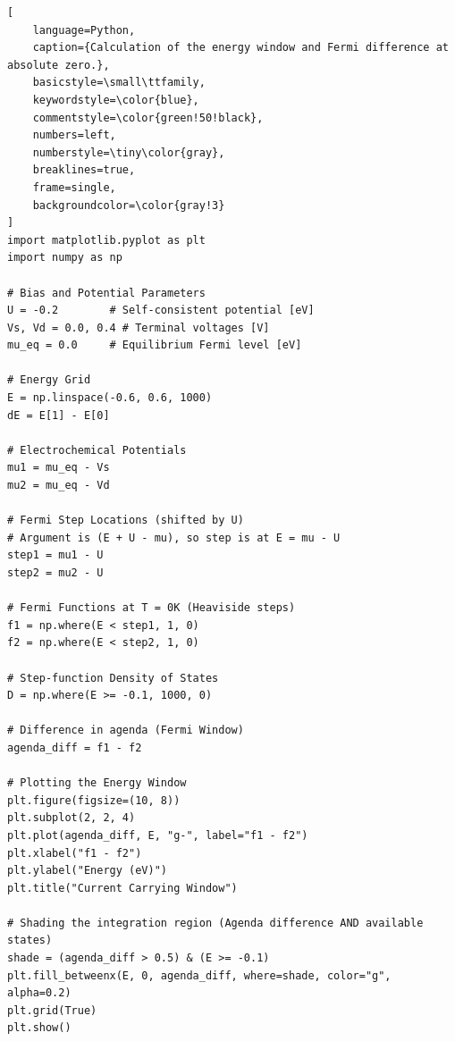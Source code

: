 \documentclass[a4paper, 10pt]{article}
\begin{document}
\begin{lstlisting}[
    language=Python,
    caption={Calculation of the energy window and Fermi difference at absolute zero.},
    basicstyle=\small\ttfamily,
    keywordstyle=\color{blue},
    commentstyle=\color{green!50!black},
    numbers=left,
    numberstyle=\tiny\color{gray},
    breaklines=true,
    frame=single,
    backgroundcolor=\color{gray!3}
]
import matplotlib.pyplot as plt
import numpy as np

# Bias and Potential Parameters
U = -0.2        # Self-consistent potential [eV]
Vs, Vd = 0.0, 0.4 # Terminal voltages [V]
mu_eq = 0.0     # Equilibrium Fermi level [eV]

# Energy Grid
E = np.linspace(-0.6, 0.6, 1000)
dE = E[1] - E[0]

# Electrochemical Potentials
mu1 = mu_eq - Vs
mu2 = mu_eq - Vd

# Fermi Step Locations (shifted by U)
# Argument is (E + U - mu), so step is at E = mu - U
step1 = mu1 - U
step2 = mu2 - U

# Fermi Functions at T = 0K (Heaviside steps)
f1 = np.where(E < step1, 1, 0)
f2 = np.where(E < step2, 1, 0)

# Step-function Density of States
D = np.where(E >= -0.1, 1000, 0)

# Difference in agenda (Fermi Window)
agenda_diff = f1 - f2

# Plotting the Energy Window
plt.figure(figsize=(10, 8))
plt.subplot(2, 2, 4)
plt.plot(agenda_diff, E, "g-", label="f1 - f2")
plt.xlabel("f1 - f2")
plt.ylabel("Energy (eV)")
plt.title("Current Carrying Window")

# Shading the integration region (Agenda difference AND available states)
shade = (agenda_diff > 0.5) & (E >= -0.1)
plt.fill_betweenx(E, 0, agenda_diff, where=shade, color="g", alpha=0.2)
plt.grid(True)
plt.show()
\end{lstlisting}
\end{document}
